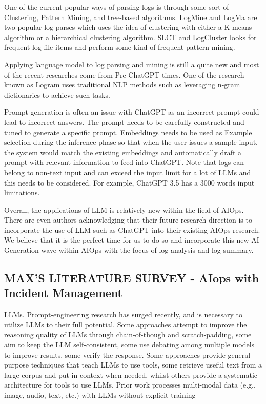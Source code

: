 \documentclass[conference]{IEEEtran}
\begin{document}
One of the current popular ways of parsing logs is through some sort of Clustering, Pattern Mining, and tree-based algorithms. LogMine and LogMa are two popular log parses which uses the idea of clustering with either a K-means algorithm or a hierarchical clustering algorithm. SLCT and LogCluster looks for frequent log file items and perform some kind of frequent pattern mining. \cite{survey-log-aiops}

Applying language model to log parsing and mining is still a quite new and most of the recent researches come from Pre-ChatGPT times. One of the research known as Logram uses traditional NLP methods such as leveraging n-gram dictionaries to achieve such tasks. \cite{10189040}

Prompt generation is often an issue with ChatGPT as an incorrect prompt could lead to incorrect answers. The prompt needs to be carefully constructed and tuned to generate a specific prompt. Embeddings needs to be used as Example selection during the inference phase so that when the user issues a sample input, the system would match the existing embeddings and automatically draft a prompt with relevant information to feed into ChatGPT. Note that logs can belong to non-text input and can exceed the input limit for a lot of LLMs and this needs to be considered. For example, ChatGPT 3.5 has a 3000 words input limitations. \cite{zhoudb}

Overall, the applications of LLM is relatively new within the field of AIOps. There are even authors acknowledging that their future research direction is to incorporate the use of LLM such as ChatGPT into their existing AIOps research. \cite{bendimerad2023premise} We believe that it is the perfect time for us to do so and incorporate this new AI Generation wave within AIOps with the focus of log analysis and log summary.

\subsection{MAX'S LITERATURE SURVEY - AIops with Incident Management}

LLMs. Prompt-engineering research has surged recently, and is necessary to utilize LLMs to their full potential. Some approaches attempt to improve the reasoning quality of LLMs through chain-of-though and scratch-padding, some aim to keep the LLM self-consistent, some use debating among multiple models to improve results, some verify the response. Some approaches provide general-purpose techniques that teach LLMs to use tools, some retrieve useful text from a large corpus and put in context when needed, whilst others provide a systematic architecture for tools to use LLMs. Prior work processes multi-modal data (e.g., image, audio, text, etc.) with LLMs without explicit training\cite{hamadanian2023a} 
\end{document}
